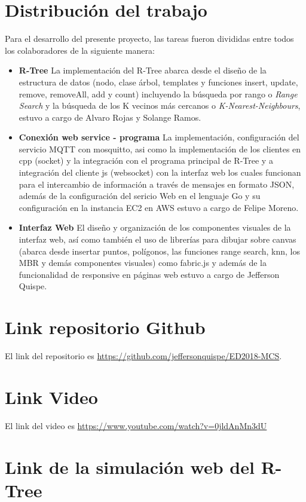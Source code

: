 \documentclass[a4paper]{article}
\begin{document}
\section{Distribución del trabajo}
Para el desarrollo del presente proyecto, las tareas fueron divididas entre todos los colaboradores de la siguiente manera:
\begin{itemize}
    \item \textbf{R-Tree} La implementación del R-Tree abarca desde el diseño de la estructura de datos (nodo, clase árbol, templates y funciones insert, update, remove, removeAll, add y count) incluyendo la búsqueda por rango o \textit{Range Search} y la búsqueda de los K vecinos más cercanos o \textit{K-Nearest-Neighbours}, estuvo a cargo de Alvaro Rojas y Solange Ramos. 
    \item \textbf{Conexión web service - programa} La implementación, configuración del servicio MQTT con mosquitto, asi como la implementación de los clientes en cpp (socket) y la integración con el programa principal de R-Tree y a integración del cliente js (websocket) con la interfaz web los cuales funcionan para el intercambio de información a través de mensajes en formato JSON, además de la configuración del sericio Web en el lenguaje Go y su configuración en la instancia EC2 en AWS estuvo a cargo de Felipe Moreno.
    \item \textbf{Interfaz Web} El diseño y organización de los componentes visuales de la interfaz web, así como también el uso de librerías para dibujar sobre canvas (abarca desde insertar puntos, polígonos, las funciones range search, knn, los MBR y demás componentes visuales) como fabric.js y además de la funcionalidad de responsive en páginas web estuvo a cargo de Jefferson Quispe.
\end{itemize}

\section{Link repositorio Github}

El link del repositorio es \url{https://github.com/jeffersonquispe/ED2018-MCS}.

\section{Link Video}

El link del video es \url{https://www.youtube.com/watch?v=0jldAnMn3dU}

\section{Link de la simulación web del R-Tree}
\end{document}
